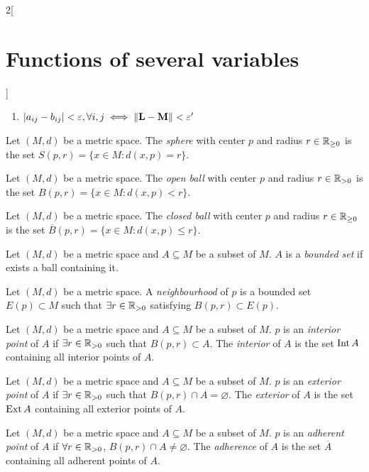 \documentclass[../../../main_math.tex]{subfiles}
\begin{document}
\begin{multicols}{2}[\section{Functions of several variables}]
\begin{corollary}
\begin{enumerate}
      \item $|a_{ij}-b_{ij}|<\varepsilon,\forall i,j\iff\|\boldsymbol{\mathrm{L}}-\boldsymbol{\mathrm{M}}\|<\varepsilon'$
    \end{enumerate}
  \end{corollary}
  \begin{definition}
    Let $(M,d)$ be a metric space. The \emph{sphere} with center $p$ and radius $r\in\mathbb{R}_{\geq 0}$ is the set $S(p,r)=\{x\in M:d(x,p)=r\}$.
  \end{definition}
  \begin{definition}
    Let $(M,d)$ be a metric space. The \emph{open ball} with center $p$ and radius $r\in\mathbb{R}_{>0}$ is the set $B(p,r)=\{x\in M:d(x,p)<r\}$.
  \end{definition}
  \begin{definition}
    Let $(M,d)$ be a metric space. The \emph{closed ball} with center $p$ and radius $r\in\mathbb{R}_{\geq 0}$ is the set $\overline{B}(p,r)=\{x\in M:d(x,p)\leq r\}$.
  \end{definition}
  \begin{definition}
    Let $(M,d)$ be a metric space and $A\subseteq M$ be a subset of $M$. $A$ is a \emph{bounded set} if exists a ball containing it.
  \end{definition}
  \begin{definition}
    Let $(M,d)$ be a metric space. A \emph{neighbourhood} of $p$ is a bounded set $E(p)\subset M$ such that $\exists r\in\mathbb{R}_{>0}$ satisfying $B(p,r)\subset E(p)$.
  \end{definition}
  \begin{definition}
    Let $(M,d)$ be a metric space and $A\subseteq M$ be a subset of $M$. $p$ is an \emph{interior point} of $A$ if $\exists r\in\mathbb{R}_{>0}$ such that $B(p,r)\subset A$. The \emph{interior} of $A$ is the set $\operatorname{Int} A$ containing all interior points of $A$.
  \end{definition}
  \begin{definition}
    Let $(M,d)$ be a metric space and $A\subseteq M$ be a subset of $M$. $p$ is an \emph{exterior point} of $A$ if $\exists r\in\mathbb{R}_{>0}$ such that $B(p,r)\cap A=\varnothing$. The \emph{exterior} of $A$ is the set $\operatorname{Ext} A$ containing all exterior points of $A$.
  \end{definition}
  \begin{definition}
    Let $(M,d)$ be a metric space and $A\subseteq M$ be a subset of $M$. $p$ is an \emph{adherent point} of $A$ if $\forall r\in\mathbb{R}_{>0}$, $B(p,r)\cap A\ne\varnothing$. The \emph{adherence} of $A$ is the set $\overline{A}$ containing all adherent points of $A$.

\end{definition}
\end{multicols}
\end{document}
